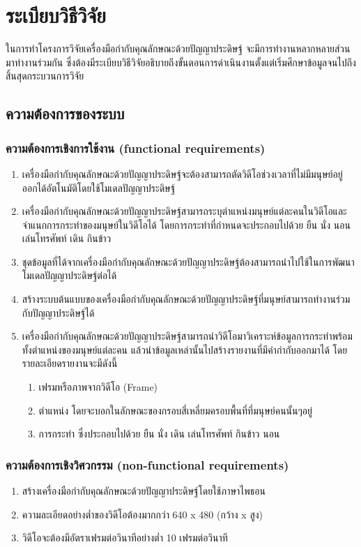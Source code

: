 \chapter{ระเบียบวิธีวิจัย}
ในการทําโครงการวิจัยเครื่องมือกำกับคุณลักษณะด้วยปัญญาประดิษฐ์ จะมีการทำงานหลากหลายส่วนมาทำงานร่วมกัน 
ซึ่งต้องมีระเบียบวิธีวิจัยอธิบายถึงขั้นตอนการดำเนินงานตั้งแต่เริ่มศึกษาข้อมูลจนไปถึงสิ้นสุดกระบวนการวิจัย
\section{ความต้องการของระบบ}
\subsection{ความต้องการเชิงการใช้งาน (functional requirements)}
\begin{enumerate}
	\setlength\itemsep{-0.25em}
    \item เครื่องมือกำกับคุณลักษณะด้วยปัญญาประดิษฐ์จะต้องสามารถตัดวิดีโอช่วงเวลาที่ไม่มีมนุษย์อยู่ออกได้อัตโนมัติโดยใช้โมเดลปัญญาประดิษฐ์ 
	\item เครื่องมือกำกับคุณลักษณะด้วยปัญญาประดิษฐ์สามารถระบุตำแหน่งมนุษย์แต่ละคนในวิดีโอและจำแนกการกระทำของมนุษย์ในวิดีโอได้ 
	โดยการกระทำที่กำหนดจะประกอบไปด้วย ยืน นั่ง นอน เล่นโทรศัพท์ เดิน กินข้าว
	\item ชุดข้อมูลที่ได้จากเครื่องมือกำกับคุณลักษณะด้วยปัญญาประดิษฐ์ต้องสามารถนำไปใช้ในการพัฒนาโมเดลปัญญาประดิษฐ์ต่อได้ 
	\item สร้างระบบต้นแบบของเครื่องมือกำกับคุณลักษณะด้วยปัญญาประดิษฐ์ที่มนุษย์สามารถทำงานร่วมกับปัญญาประดิษฐ์ได้
	\item เครื่องมือกำกับคุณลักษณะด้วยปัญญาประดิษฐ์สามารถนำวิดีโอมาวิเคราะห์ข้อมูลการกระทำพร้อมทั้งตำแหน่งของมนุษย์แต่ละคน แล้วนำข้อมูลเหล่านั้นไปสร้างรายงานที่มีคำกำกับออกมาได้ โดยรายละเอียดรายงานจะมีดังนี้
	\begin{enumerate}
		\item เฟรมหรือภาพจากวิดีโอ (Frame)
		\item ตำแหน่ง โดยจะบอกในลักษณะของกรอบสี่เหลี่ยมครอบพื้นที่ที่มนุษย์คนนั้นๆอยู่
		\item การกระทำ ซึ่งประกอบไปด้วย ยืน นั่ง เดิน เล่นโทรศัพท์ กินข้าว นอน
	\end{enumerate}
\end{enumerate}
\subsection{ความต้องการเชิงวิศวกรรม (non-functional requirements)}
\begin{enumerate}
	\setlength\itemsep{-0.25em}
	\item สร้างเครื่องมือกำกับคุณลักษณะด้วยปัญญาประดิษฐ์โดยใช้ภาษาไพธอน
	\item ความละเอียดอย่างต่ำของวิดีโอต้องมากกว่า 640 x 480 (กว้าง x สูง) 
	\item วิดีโอจะต้องมีอัตราเฟรมต่อวินาทีอย่างต่ำ 10 เฟรมต่อวินาที
\end{enumerate}
\clearpage

